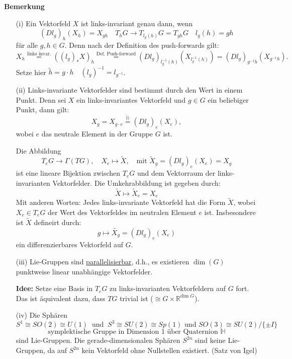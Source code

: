 \documentclass[fleqn, 12pt, letterpaper]{article}
\newcommand{\txt}[1]{\text{#1}}
\begin{document}
\textbf{Bemerkung}
\begin{itemize}
    \item[(i)] Ein Vektorfeld \( X \) ist links-invariant genau dann, wenn 
    \[ (Dl_g)_h(X_h) = X_{gh} \quad T_hG \rightarrow T_{l_g(h)}G=T_{gh}G \quad l_g(h)=gh\]
    für alle \( g, h \in G \). Denn nach der Definition des push-forwards
    gilt:
    \[
    X_h \overset{\txt{links invar.}}{=}((l_g)_* X)_h \overset{\txt{Def. Push-forward}}{=}\left(Dl_g\right)_{l_{g}^{-1}(h)} \left(X_{l_{g}^{-1}(h)}\right) = \left(Dl_g\right)_{g^{-1}h} \left(X_{g^{-1}h}\right).
    \]
    Setze hier \( \tilde{h} = g \cdot h  \quad (l_g)^{-1}=l_{g^{-1}} \).

    \item[(ii)] Links-invariante Vektorfelder sind bestimmt durch den Wert in einem Punkt. Denn sei \( X \) ein links-invariantes Vektorfeld und \( g \in G \) ein beliebiger Punkt, dann gilt:
    \[
    X_g = X_{g\cdot e} \overset{\txt{i)}}{=} (Dl_g)_e(X_e),
    \]
    wobei \( e \) das neutrale Element in der Gruppe \( G \) ist.

    Die Abbildung
    \[
    T_e G \longrightarrow \Gamma(TG), \quad X_e \longmapsto \tilde{X}, \quad \text{mit } \tilde{X}_g = (Dl_g)_e(X_e) = X_g
    \]
    ist eine lineare Bijektion zwischen \( T_e G \) und dem Vektorraum der links-invarianten Vektorfelder. Die Umkehrabbildung ist gegeben durch:
    \[
    \tilde{X} \longmapsto \tilde{X}_e = X_e
    \]
    Mit anderen Worten: Jedes links-invariante Vektorfeld hat die Form \( \tilde{X} \), wobei \( X_e \in T_e G \) der Wert des Vektorfeldes im neutralen Element \( e \) ist. Insbesondere ist $\tilde{X}$ defineirt durch:
    \[
    g \longmapsto \tilde{X_g}=(Dl_g)_e(X_e)
    \]
    ein differenzierbares Vektorfeld auf \( G \).
    
    \item[(iii)] Lie-Gruppen sind \underline{parallelisierbar}, d.h., es existieren \( \dim(G) \) punktweise linear unabhängige Vektorfelder. 

    \textbf{Idee:} Setze eine Basis in \( T_e G \) zu links-invarianten Vektorfeldern auf \( G \) fort. \\
    Das ist äquivalent dazu, dass \( TG \) trivial ist ($\cong G\times \mathbb{R}^{\txt{dim } G}$).
    
    \item[(iv)] Die Sphären 
    \[
    S^1 \cong SO(2) \cong U(1) \;\; \text{und} \;\; S^3 \cong SU(2) \cong Sp(1) \text{ und } SO(3) \cong SU(2) / \{\pm I\}
    \]
    \[\txt{symplektische Gruppe in Dimension 1 über Quaternion $\mathbb{H}$}\]
    sind Lie-Gruppen. Die gerade-dimensionalen Sphären \( S^{2n} \) sind keine Lie-Gruppen, da auf \( S^{2n} \) kein Vektorfeld ohne Nullstellen existiert. (Satz von Igel)


\end{itemize}
\end{document}

